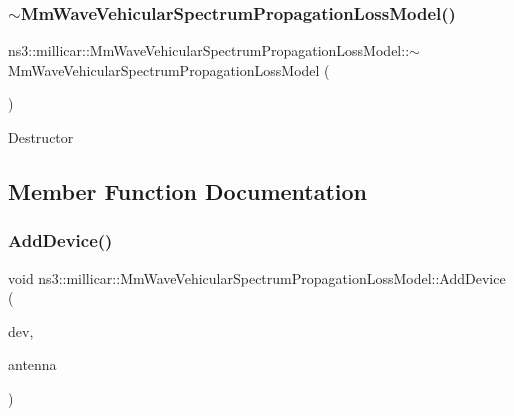 \subsubsection{\texorpdfstring{$\sim$\+Mm\+Wave\+Vehicular\+Spectrum\+Propagation\+Loss\+Model()}{~MmWaveVehicularSpectrumPropagationLossModel()}}
{\footnotesize\ttfamily ns3\+::millicar\+::\+Mm\+Wave\+Vehicular\+Spectrum\+Propagation\+Loss\+Model\+::$\sim$\+Mm\+Wave\+Vehicular\+Spectrum\+Propagation\+Loss\+Model (\begin{DoxyParamCaption}{ }\end{DoxyParamCaption})\hspace{0.3cm}{\ttfamily [virtual]}}

Destructor 

\subsection{Member Function Documentation}
\mbox{\label{classns3_1_1millicar_1_1MmWaveVehicularSpectrumPropagationLossModel_ab2c520f59106e0e7a919d6c724a8dd96}} 
\subsubsection{\texorpdfstring{Add\+Device()}{AddDevice()}}
{\footnotesize\ttfamily void ns3\+::millicar\+::\+Mm\+Wave\+Vehicular\+Spectrum\+Propagation\+Loss\+Model\+::\+Add\+Device (\begin{DoxyParamCaption}\item[{Ptr$<$ Net\+Device $>$}]{dev,  }\item[{Ptr$<$ \hyperlink{classns3_1_1millicar_1_1MmWaveVehicularAntennaArrayModel}{Mm\+Wave\+Vehicular\+Antenna\+Array\+Model} $>$}]{antenna }\end{DoxyParamCaption})}

